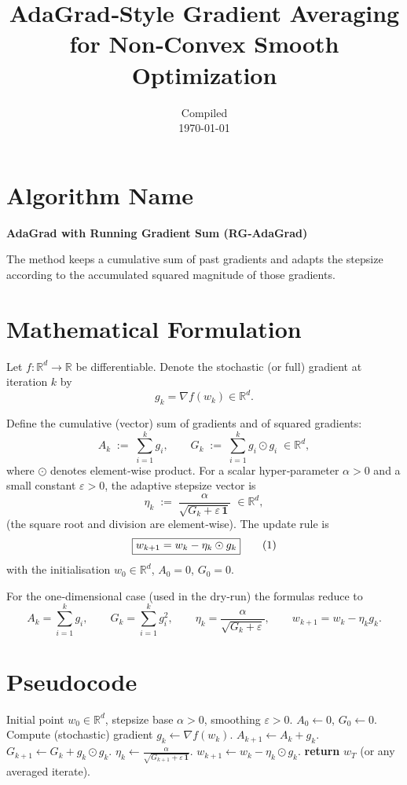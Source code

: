 \documentclass[11pt]{article}
\newcommand{\R}{\mathbb{R}}
\begin{document}
\title{AdaGrad‑Style Gradient Averaging for Non‑Convex Smooth Optimization}
\author{Compiled \\ \today}
\maketitle

\section*{Algorithm Name}
\textbf{AdaGrad with Running Gradient Sum (RG‑AdaGrad)}  

The method keeps a cumulative sum of past gradients and adapts the stepsize
according to the accumulated squared magnitude of those gradients.

\section*{Mathematical Formulation}
Let $f:\R^{d}\rightarrow\R$ be differentiable.  
Denote the stochastic (or full) gradient at iteration $k$ by 
\[
g_{k}=\nabla f(w_{k})\in\R^{d}.
\]

Define the cumulative (vector) sum of gradients and of squared gradients:
\[
A_{k}\;:=\;\sum_{i=1}^{k} g_{i},\qquad
G_{k}\;:=\;\sum_{i=1}^{k} g_{i}\odot g_{i}\;\in\R^{d},
\]
where $\odot$ denotes element‑wise product.  
For a scalar hyper‑parameter $\alpha>0$ and a small constant $\varepsilon>0$,
the adaptive stepsize vector is
\[
\eta_{k}\;:=\;\frac{\alpha}{\sqrt{G_{k}+\varepsilon\,\mathbf 1}}\;\in\R^{d},
\]
(the square root and division are element‑wise).  
The update rule is
\[
\boxed{%
w_{k+1}=w_{k}-\eta_{k}\odot g_{k}
}\tag{1}
\]
with the initialisation $w_{0}\in\R^{d}$, $A_{0}=0$, $G_{0}=0$.

For the one‑dimensional case (used in the dry‑run) the formulas reduce to
\[
A_{k}= \sum_{i=1}^{k} g_{i},\qquad
G_{k}= \sum_{i=1}^{k} g_{i}^{2},\qquad
\eta_{k}= \frac{\alpha}{\sqrt{G_{k}+\varepsilon}} ,
\qquad
w_{k+1}= w_{k}-\eta_{k} g_{k}.
\]

\section*{Pseudocode}
\begin{algorithm}[H]
\caption{RG‑AdaGrad}
\begin{algorithmic}[1]
\Require Initial point $w_{0}\in\R^{d}$, stepsize base $\alpha>0$, smoothing $\varepsilon>0$.
\State $A_{0}\gets 0$, $G_{0}\gets 0$.
    \State Compute (stochastic) gradient $g_{k}\gets \nabla f(w_{k})$.
    \State $A_{k+1}\gets A_{k}+g_{k}$.
    \State $G_{k+1}\gets G_{k}+g_{k}\odot g_{k}$.
    \State $\eta_{k}\gets \displaystyle\frac{\alpha}{\sqrt{G_{k+1}+\varepsilon\,\mathbf 1}}$.
    \State $w_{k+1}\gets w_{k}-\eta_{k}\odot g_{k}$.
\EndFor
\State \textbf{return} $w_{T}$ (or any averaged iterate).
\end{algorithmic}
\end{algorithm}
\end{document}
